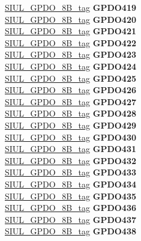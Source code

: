 \begin{DoxyCompactItemize}
\begin{tabbing}
\>\>\mbox{\hyperlink{unionSIUL__GPDO__8B__tag}{SIUL\_GPDO\_8B\_tag}} {\bfseries GPDO419}\\
\>\>\mbox{\hyperlink{unionSIUL__GPDO__8B__tag}{SIUL\_GPDO\_8B\_tag}} {\bfseries GPDO420}\\
\>\>\mbox{\hyperlink{unionSIUL__GPDO__8B__tag}{SIUL\_GPDO\_8B\_tag}} {\bfseries GPDO421}\\
\>\>\mbox{\hyperlink{unionSIUL__GPDO__8B__tag}{SIUL\_GPDO\_8B\_tag}} {\bfseries GPDO422}\\
\>\>\mbox{\hyperlink{unionSIUL__GPDO__8B__tag}{SIUL\_GPDO\_8B\_tag}} {\bfseries GPDO423}\\
\>\>\mbox{\hyperlink{unionSIUL__GPDO__8B__tag}{SIUL\_GPDO\_8B\_tag}} {\bfseries GPDO424}\\
\>\>\mbox{\hyperlink{unionSIUL__GPDO__8B__tag}{SIUL\_GPDO\_8B\_tag}} {\bfseries GPDO425}\\
\>\>\mbox{\hyperlink{unionSIUL__GPDO__8B__tag}{SIUL\_GPDO\_8B\_tag}} {\bfseries GPDO426}\\
\>\>\mbox{\hyperlink{unionSIUL__GPDO__8B__tag}{SIUL\_GPDO\_8B\_tag}} {\bfseries GPDO427}\\
\>\>\mbox{\hyperlink{unionSIUL__GPDO__8B__tag}{SIUL\_GPDO\_8B\_tag}} {\bfseries GPDO428}\\
\>\>\mbox{\hyperlink{unionSIUL__GPDO__8B__tag}{SIUL\_GPDO\_8B\_tag}} {\bfseries GPDO429}\\
\>\>\mbox{\hyperlink{unionSIUL__GPDO__8B__tag}{SIUL\_GPDO\_8B\_tag}} {\bfseries GPDO430}\\
\>\>\mbox{\hyperlink{unionSIUL__GPDO__8B__tag}{SIUL\_GPDO\_8B\_tag}} {\bfseries GPDO431}\\
\>\>\mbox{\hyperlink{unionSIUL__GPDO__8B__tag}{SIUL\_GPDO\_8B\_tag}} {\bfseries GPDO432}\\
\>\>\mbox{\hyperlink{unionSIUL__GPDO__8B__tag}{SIUL\_GPDO\_8B\_tag}} {\bfseries GPDO433}\\
\>\>\mbox{\hyperlink{unionSIUL__GPDO__8B__tag}{SIUL\_GPDO\_8B\_tag}} {\bfseries GPDO434}\\
\>\>\mbox{\hyperlink{unionSIUL__GPDO__8B__tag}{SIUL\_GPDO\_8B\_tag}} {\bfseries GPDO435}\\
\>\>\mbox{\hyperlink{unionSIUL__GPDO__8B__tag}{SIUL\_GPDO\_8B\_tag}} {\bfseries GPDO436}\\
\>\>\mbox{\hyperlink{unionSIUL__GPDO__8B__tag}{SIUL\_GPDO\_8B\_tag}} {\bfseries GPDO437}\\
\>\>\mbox{\hyperlink{unionSIUL__GPDO__8B__tag}{SIUL\_GPDO\_8B\_tag}} {\bfseries GPDO438}\\

\end{tabbing}
\end{DoxyCompactItemize}
